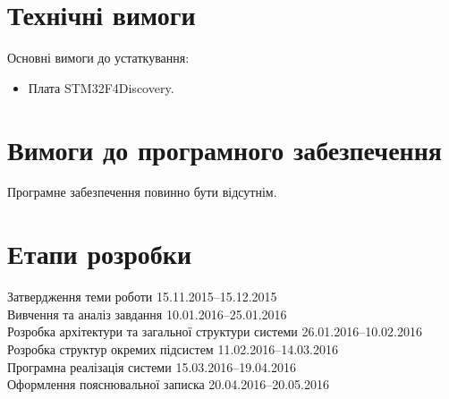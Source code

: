 \documentclass[main.tex]{subfiles}
\begin{document}
\section{Технічні вимоги}
Основні вимоги до устаткування:
\begin{itemize}
\item Плата STM32F4Discovery.
\end{itemize}

\section{Вимоги до програмного забезпечення}
Програмне забезпечення повинно бути відсутнім.

\section{Етапи розробки}

\noindent
Затвердження теми роботи \hfill 15.11.2015--15.12.2015 \\
Вивчення та аналіз завдання \hfill 10.01.2016--25.01.2016 \\
Розробка архітектури та загальної структури системи \hfill 26.01.2016--10.02.2016 \\
Розробка структур окремих підсистем \hfill 11.02.2016--14.03.2016 \\
Програмна реалізація системи \hfill 15.03.2016--19.04.2016 \\
Оформлення пояснювальної записка \hfill 20.04.2016--20.05.2016 \\

\finalizepart{}
\end{document}
